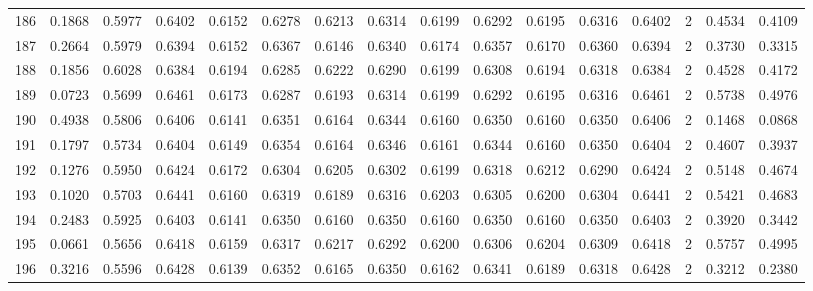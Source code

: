 \begin{tabular}{lrrrrrrrrrrrrrrr}
186 &      0.1868 &  0.5977 &  0.6402 &  0.6152 &  0.6278 &  0.6213 &  0.6314 &  0.6199 &  0.6292 &  0.6195 &   0.6316 &     0.6402 &      2 &                    0.4534 &                     0.4109 \\
187 &      0.2664 &  0.5979 &  0.6394 &  0.6152 &  0.6367 &  0.6146 &  0.6340 &  0.6174 &  0.6357 &  0.6170 &   0.6360 &     0.6394 &      2 &                    0.3730 &                     0.3315 \\
188 &      0.1856 &  0.6028 &  0.6384 &  0.6194 &  0.6285 &  0.6222 &  0.6290 &  0.6199 &  0.6308 &  0.6194 &   0.6318 &     0.6384 &      2 &                    0.4528 &                     0.4172 \\
189 &      0.0723 &  0.5699 &  0.6461 &  0.6173 &  0.6287 &  0.6193 &  0.6314 &  0.6199 &  0.6292 &  0.6195 &   0.6316 &     0.6461 &      2 &                    0.5738 &                     0.4976 \\
190 &      0.4938 &  0.5806 &  0.6406 &  0.6141 &  0.6351 &  0.6164 &  0.6344 &  0.6160 &  0.6350 &  0.6160 &   0.6350 &     0.6406 &      2 &                    0.1468 &                     0.0868 \\
191 &      0.1797 &  0.5734 &  0.6404 &  0.6149 &  0.6354 &  0.6164 &  0.6346 &  0.6161 &  0.6344 &  0.6160 &   0.6350 &     0.6404 &      2 &                    0.4607 &                     0.3937 \\
192 &      0.1276 &  0.5950 &  0.6424 &  0.6172 &  0.6304 &  0.6205 &  0.6302 &  0.6199 &  0.6318 &  0.6212 &   0.6290 &     0.6424 &      2 &                    0.5148 &                     0.4674 \\
193 &      0.1020 &  0.5703 &  0.6441 &  0.6160 &  0.6319 &  0.6189 &  0.6316 &  0.6203 &  0.6305 &  0.6200 &   0.6304 &     0.6441 &      2 &                    0.5421 &                     0.4683 \\
194 &      0.2483 &  0.5925 &  0.6403 &  0.6141 &  0.6350 &  0.6160 &  0.6350 &  0.6160 &  0.6350 &  0.6160 &   0.6350 &     0.6403 &      2 &                    0.3920 &                     0.3442 \\
195 &      0.0661 &  0.5656 &  0.6418 &  0.6159 &  0.6317 &  0.6217 &  0.6292 &  0.6200 &  0.6306 &  0.6204 &   0.6309 &     0.6418 &      2 &                    0.5757 &                     0.4995 \\
196 &      0.3216 &  0.5596 &  0.6428 &  0.6139 &  0.6352 &  0.6165 &  0.6350 &  0.6162 &  0.6341 &  0.6189 &   0.6318 &     0.6428 &      2 &                    0.3212 &                     0.2380 \\

\end{tabular}

